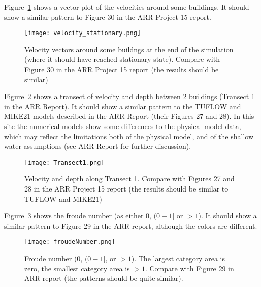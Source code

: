 \documentclass{article}
\begin{document}
Figure~\ref{fig:stationary_vel} shows a vector plot of the velocities around some buildings. It should
show a similar pattern to Figure 30 in the ARR Project 15 report.
\begin{figure}
\texttt{[image: velocity\_stationary.png]}
\caption{Velocity vectors around some buildngs at the end of the simulation
(where it should have reached stationary state). Compare with Figure 30 in the ARR Project 15 report (the results should be similar)}
\label{fig:stationary_vel}
\end{figure}

Figure~\ref{fig:transect1} shows a transect of velocity and depth between 2 buildings (Transect
1 in the ARR Report).  It should show a similar pattern to the TUFLOW and
MIKE21 models described in the ARR Report (their Figures 27 and 28).  In this
site the numerical models show some differences to the physical model data,
which may reflect the limitations both of the physical model, and of the
shallow water assumptions (see ARR Report for further discussion).
\begin{figure}
\texttt{[image: Transect1.png]}
\caption{Velocity and depth along Transect 1. Compare with Figures 27 and 28 
in the ARR Project 15 report (the results should be similar to TUFLOW and
MIKE21)}
\label{fig:transect1}
\end{figure}

Figure~\ref{fig:froude} shows the froude number (as either 0, $(0-1]$ or $>1$).  It
should show a similar pattern to Figure 29 in the ARR report, although the
colors are different. 
\begin{figure}
\center
\texttt{[image: froudeNumber.png]}
\caption{Froude number (0, $(0-1]$, or $>1$). The largest category area is
zero, the smallest category area is $>1$. Compare with Figure 29 in ARR report
(the patterns should be quite similar).}
\label{fig:froude}
\end{figure}
\end{document}

